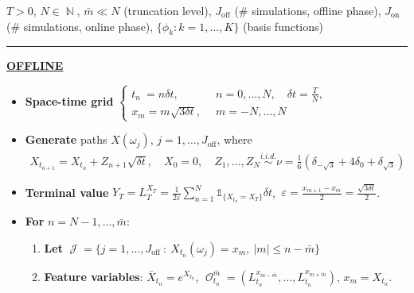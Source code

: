 \documentclass[11pt]{article}
\theoremstyle{plain}
\theoremstyle{definition}
\DeclareMathOperator{\N}{\mathbb{N}}
\DeclareMathOperator{\calJ}{\mathcal{J}}
\DeclareMathOperator{\calO}{\mathcal{O}}
\begin{document}
\begin{algorithm}[H]
\caption{(Least Square Monte Carlo,  Spot Local Time) }\label{alg:LSMC}

\vspace{1mm}
 $T>0$, $N \in \N$,  $\bar{m}\ll N$ (truncation level), $J_{\text{off}}$ (\# simulations, offline phase), 
  $J_{\text{on}}$ (\# simulations,  online phase), $\{\phi_k : k=1,\ldots ,K\}$ (basis functions)
 \\[-0.8em] 
\noindent\rule{\textwidth}{0.5pt} 
\textbf{\underline{OFFLINE}}
\begin{itemize}
 \setlength \itemsep{0.15em}

\item[I.] \textbf{Space-time grid} $\begin{cases}
     t_n \ = n\delta t, \; \  &n=0,\ldots, N, \quad  \delta t = \frac{T}{N}, \\
     x_m =  m \sqrt{3\delta t},  \; \  &m=-N,\ldots,N
\end{cases}$
 
\item[II.] \textbf{Generate} paths $X(\omega_j)$,  $j=1,\ldots,J_{\text{off}}$, where  
\begin{align*}
  X_{t_{n+1}} = X_{t_n} + Z_{n+1} \sqrt{\delta t}, \quad  X_0 = 0, \quad Z_{1},\ldots,Z_{N} \overset{i.i.d.}{\sim} \nu = \frac{1}{6}\left(\delta_{-\sqrt{3}} + 4\delta_0 + \delta_{\sqrt{3}}\right) 
\end{align*}

\item[III.] \textbf{Terminal value} $Y_{T}= L_T^{X_T} = \frac{1}{2\varepsilon}\sum_{n=1}^N  \mathds{1}_{\{X_{t_n} = X_T\}} \delta t$, $\ \varepsilon = \frac{x_{m+1}-x_m}{2} = \frac{\sqrt{3\delta t }}{2}$.

\item[IV.] \textbf{For} $n=N-1,\ldots,\bar{m}$: 
\begin{enumerate}


     \item \textbf{Let} $\calJ = \{j =1,\ldots,J_{\text{off}} \ : \ X_{t_n}(\omega_j) = x_m, \ |m| \le n- \bar{m}\}$%

    \item \textbf{Feature variables}:  $\bar{X}_{t_n} = e^{X_{t_n}}$,  $\calO_{t_n}^{\bar{m}} =(L_{t_n}^{x_{m-\bar{m}}},\ldots, L_{t_n}^{x_{m+\bar{m}}} )$, 
    $x_m = X_{t_n}$.
    

\end{enumerate}
\end{itemize}
\end{algorithm}
\end{document}
